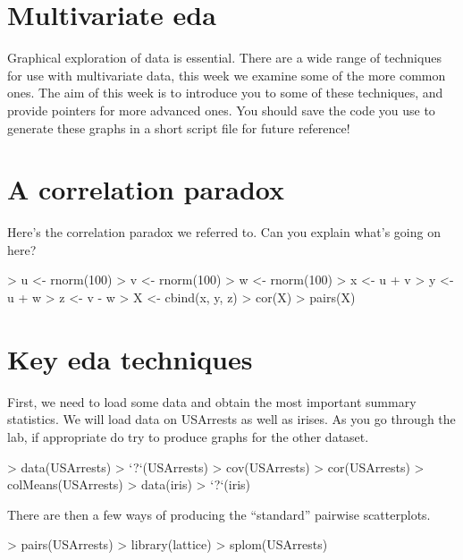 

\section{Multivariate eda}

Graphical exploration of data is essential.   There are a wide range of techniques for use with multivariate data, this week we examine some of the more common ones.   The aim of this week is to introduce you to some of these techniques, and provide pointers for more advanced ones.   You should save the code you use to generate these graphs in a short script file for future reference!


\section{A correlation paradox}

Here's the correlation paradox we referred to.   Can you explain what's going on here?

\begin{Schunk}
\begin{Sinput}
> u <- rnorm(100)
> v <- rnorm(100)
> w <- rnorm(100)
> x <- u + v
> y <- u + w
> z <- v - w
> X <- cbind(x, y, z)
> cor(X)
> pairs(X)
\end{Sinput}
\end{Schunk}


\section{Key eda techniques}

First, we need to load some data and obtain the most important summary statistics.   We will load data on USArrests as well as irises.   As you go through the lab, if appropriate do try to produce graphs for the other dataset.

\begin{Schunk}
\begin{Sinput}
> data(USArrests)
> `?`(USArrests)
> cov(USArrests)
> cor(USArrests)
> colMeans(USArrests)
> data(iris)
> `?`(iris)
\end{Sinput}
\end{Schunk}

There are then a few ways of producing the ``standard'' pairwise scatterplots.

\begin{Schunk}
\begin{Sinput}
> pairs(USArrests)
> library(lattice)
> splom(USArrests)
\end{Sinput}
\end{Schunk}



